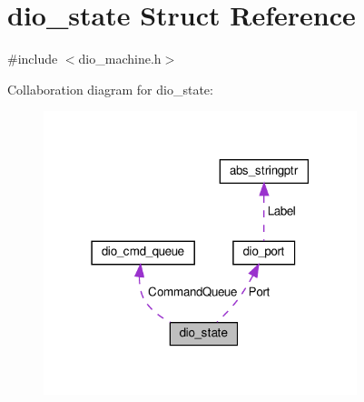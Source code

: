 \hypertarget{structdio__state}{}\section{dio\+\_\+state Struct Reference}
\label{structdio__state}


{\ttfamily \#include $<$dio\+\_\+machine.\+h$>$}



Collaboration diagram for dio\+\_\+state\+:\nopagebreak
\begin{figure}[H]
\begin{center}
\leavevmode
\includegraphics[width=259pt]{d4/ded/structdio__state__coll__graph}
\end{center}
\end{figure}
